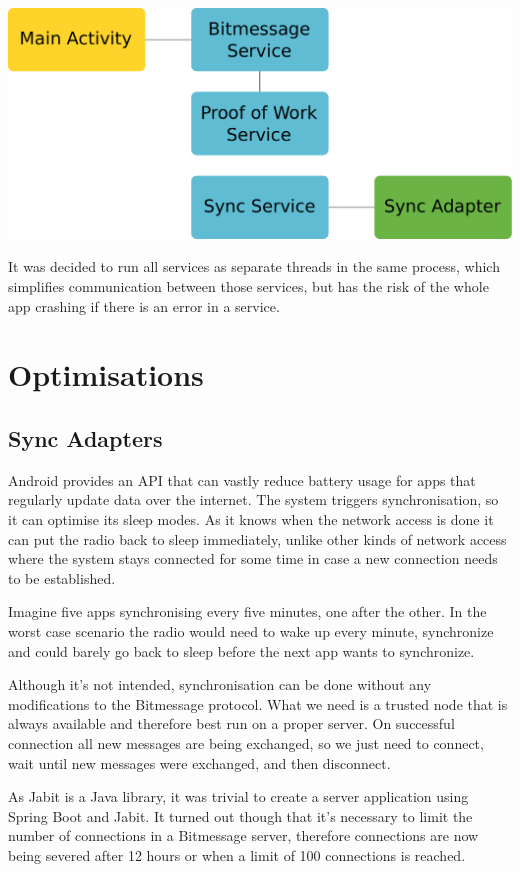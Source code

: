 \documentclass{bfh}
\begin{document}
  \begin{center}
    \includegraphics[width=0.8 \textwidth]{images/services.pdf}
  \end{center}

  It was decided to run all services as separate threads in the same process, which simplifies communication between those services, but has the risk of the whole app crashing if there is an error in a service.


  \newpage
  \section{Optimisations}
  \subsection{Sync Adapters}
  Android provides an API that can vastly reduce battery usage for apps that regularly update data over the internet. The system triggers synchronisation, so it can optimise its sleep modes. As it knows when the network access is done it can put the radio back to sleep immediately, unlike other kinds of network access where the system stays connected for some time in case a new connection needs to be established.

  Imagine five apps synchronising every five minutes, one after the other. In the worst case scenario the radio would need to wake up every minute, synchronize and could barely go back to sleep before the next app wants to synchronize.

  Although it's not intended, synchronisation can be done without any modifications to the Bitmessage protocol. What we need is a trusted node that is always available and therefore best run on a proper server. On successful connection all new messages are being exchanged, so we just need to connect, wait until new messages were exchanged, and then disconnect.

  As Jabit is a Java library, it was trivial to create a server application using Spring Boot and Jabit. It turned out though that it's necessary to limit the number of connections in a Bitmessage server, therefore connections are now being severed after 12 hours or when a limit of 100 connections is reached.
\end{document}
